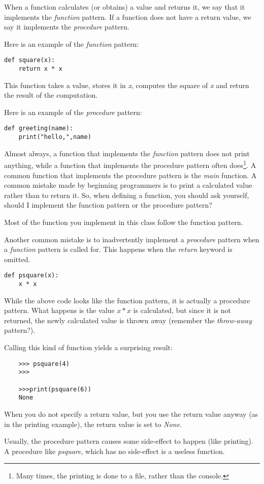 When a function calculates (or obtains) a value and returns it, we say
that it implements the {\it function} pattern. If a function
does not have a return value, we say it implements the
{\it procedure} pattern.

Here is an example of the {\it function} pattern:

\begin{verbatim}
def square(x):
    return x * x
\end{verbatim}

This function takes a value, stores it in {\it x}, computes the square
of {\it x} and return the result of the computation.

Here is an example of the {\it procedure} pattern:

\begin{verbatim}
def greeting(name):
    print("hello,",name)
\end{verbatim}

Almost always,
a function that implements the {\it function} pattern does not print
anything, while a function that implements the procedure
pattern often does\footnote{Many times, the printing is
done to a file, rather than  the console.}.
A common function that implements the procedure pattern
is the {\it main} function.
A common mistake made by beginning programmers is
to print a calculated value rather than to return it. So, when defining
a function, you should ask yourself, should I implement the function
pattern or the procedure pattern?

Most of the function you implement in this class follow the function
pattern.

Another common mistake is to inadvertently implement a {\it procedure} pattern
when a {\it function} pattern is called for. This happens when the {\it return}
keyword is omitted.

\begin{verbatim}
def psquare(x):
    x * x
\end{verbatim}

While the above code looks like the function pattern, it is actually
a procedure pattern. What happens is the value $x * x$ is calculated,
but since it is not returned, the newly calculated value is thrown
away (remember the {\it throw-away} pattern?).

Calling this kind of function yields a surprising result:

\begin{verbatim}
    >>> psquare(4)
    >>>

    >>>print(psquare(6))
    None
\end{verbatim}

When you do not specify a return value, but you use
the return value anyway (as in the printing example),
the return value is set to {\it None}.

Usually, the procedure pattern causes some side-effect to happen
(like printing). A procedure like {\it psquare}, which has no side-effect
is a useless function.
